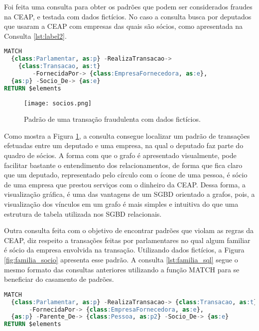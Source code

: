 Foi feita uma consulta para obter os padrões que podem ser considerados fraudes na CEAP, e testada com dados fictícios. No caso a consulta busca por deputados que usaram a CEAP com empresas das quais são sócios, como apresentada na Consulta \ref{lst:label2}.

\begin{lstlisting}[label={lst:label2}, caption={Consulta de relacionamento de uso da CEAP entre deputados e empresas nas quais o deputado é sócio.},captionpos=b, language=sql]
MATCH 
  {class:Parlamentar, as:p} -RealizaTransacao-> 
  	{class:Transacao, as:t} 
    	-FornecidaPor-> {class:EmpresaFornecedora, as:e},
  {as:p} -Socio_De-> {as:e}
RETURN $elements
\end{lstlisting}

\begin{figure}[H]
\centering
\texttt{[image: socios.png]}
\caption{Padrão de uma transação fraudulenta com dados fictícios.}
\label{fig:socios}
\end{figure}

Como mostra a Figura \ref{fig:socios}, a consulta consegue localizar um padrão de transações efetuadas entre um deputado e uma empresa, na qual o deputado faz parte do quadro de sócios. A forma com que o grafo é apresentado visualmente, pode facilitar bastante o entendimento dos relacionamentos, de forma que fica claro que um deputado, representado pelo círculo com o ícone de uma pessoa, é sócio de uma empresa que prestou serviços com o dinheiro da CEAP. Dessa forma, a visualização gráfica, é uma das vantagens de um SGBD orientado a grafos, pois, a visualização dos vínculos em um grafo é mais simples e intuitiva do que uma estrutura de tabela utilizada nos SGBD relacionais.

Outra consulta feita com o objetivo de encontrar padrões que violam as regras da CEAP, diz respeito a transações feitas por parlamentares no qual algum familiar é sócio da empresa envolvida na transação. Utilizando dados fictícios, a Figura \ref{fig:familia_socio} apresenta esse padrão. A consulta \ref{lst:familia_sql} segue o mesmo formato das consultas anteriores utilizando a função MATCH para se beneficiar do casamento de padrões.

\begin{lstlisting}[label={lst:familia_sql}, caption={Consulta de relacionamento de uso da CEAP entre deputados e empresas, em que um parente do deputado é sócio da empresa.},captionpos=b, language=sql]
MATCH 
  {class:Parlamentar, as:p} -RealizaTransacao-> {class:Transacao, as:t} 
       -FornecidaPor-> {class:EmpresaFornecedora, as:e},
  {as:p} -Parente_De-> {class:Pessoa, as:p2} -Socio_De-> {as:e}
RETURN $elements
\end{lstlisting}

